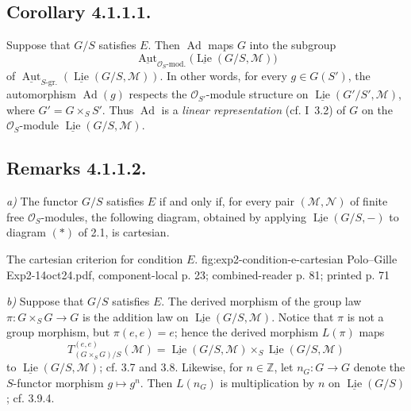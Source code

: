 \subsection*{Corollary 4.1.1.1.}
Suppose that \(G/S\) satisfies \(E\). Then \(\operatorname{Ad}\) maps \(G\)
into the subgroup
\[
  \underline{\operatorname{Aut}}_{\mathcal O_S\text{-mod.}}
    \bigl(\underline{\operatorname{Lie}}(G/S,\mathcal M)\bigr)
\]
of
\(\underline{\operatorname{Aut}}_{S\text{-gr.}}
(\underline{\operatorname{Lie}}(G/S,\mathcal M))\). In other words, for
every \(g\in G(S')\), the automorphism \(\operatorname{Ad}(g)\) respects
the \(\mathcal O_{S'}\)-module structure on
\(\underline{\operatorname{Lie}}(G'/S',\mathcal M)\), where
\(G'=G\times_SS'\). Thus \(\operatorname{Ad}\) is a \emph{linear
representation} (cf. I~3.2) of \(G\) on the \(\mathcal O_S\)-module
\(\underline{\operatorname{Lie}}(G/S,\mathcal M)\).

\subsection*{Remarks 4.1.1.2.}
\textit{a)} The functor \(G/S\) satisfies \(E\) if and only if, for every
pair \((\mathcal M,\mathcal N)\) of finite free
\(\mathcal O_S\)-modules, the following diagram, obtained by applying
\(\underline{\operatorname{Lie}}(G/S,-)\) to diagram \((*)\) of 2.1, is
cartesian.

  {The cartesian criterion for condition \(E\).}
  {fig:exp2-condition-e-cartesian}
  {Polo--Gille Exp2-14oct24.pdf, component-local p. 23; combined-reader p. 81; printed p. 71}

\textit{b)} Suppose that \(G/S\) satisfies \(E\). The derived morphism of
the group law
\(\pi:G\times_SG\to G\) is the addition law on
\(\underline{\operatorname{Lie}}(G/S,\mathcal M)\). Notice that
\(\pi\) is not a group morphism, but \(\pi(e,e)=e\); hence the derived
morphism \(L(\pi)\) maps
\[
  T^{(e,e)}_{(G\times_SG)/S}(\mathcal M)
  =\underline{\operatorname{Lie}}(G/S,\mathcal M)
   \times_S\underline{\operatorname{Lie}}(G/S,\mathcal M)
\]
to \(\underline{\operatorname{Lie}}(G/S,\mathcal M)\); cf. 3.7 and
3.8. Likewise, for \(n\in\mathbb Z\), let \(n_G:G\to G\) denote the
\(S\)-functor morphism \(g\mapsto g^n\). Then \(L(n_G)\) is
multiplication by \(n\) on \(\underline{\operatorname{Lie}}(G/S)\); cf.
3.9.4.

